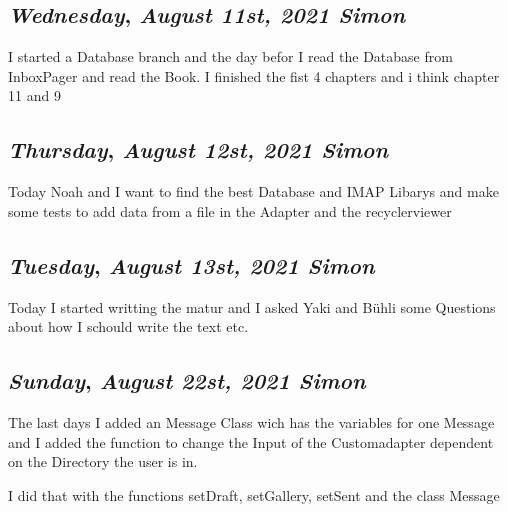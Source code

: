 \begin{center}
\section*{\month}
\end{center}


\def\day{\textit{August 11st, 2021 Simon}}
\def\weekday{\textit{Wednesday}}
\subsection*{\weekday, \day}

I started a Database branch and the day befor I read the Database from InboxPager and read the Book. 
I finished the fist 4 chapters and i think chapter 11 and 9



\def\day{\textit{August 12st, 2021 Simon}}
\def\weekday{\textit{Thursday}}
\subsection*{\weekday, \day}

Today Noah and I want to find the best Database and IMAP Libarys 
and make some tests to add data from a file in the Adapter and the recyclerviewer


\def\day{\textit{August 13st, 2021 Simon}}
\def\weekday{\textit{Tuesday}}
\subsection*{\weekday, \day}

Today I started writting the matur and I asked Yaki and Bühli some Questions about 
how I schould write the text etc. 

\def\day{\textit{August 22st, 2021 Simon}}
\def\weekday{\textit{Sunday}}
\subsection*{\weekday, \day}

The last days I added an Message Class wich has the variables for one Message and I added the function
to change the Input of the Customadapter dependent on the Directory the user is in.

I did that with the functions setDraft, setGallery, setSent and the class Message
